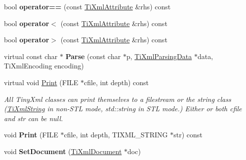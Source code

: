 \begin{DoxyCompactItemize}
\item 
bool {\bfseries operator==} (const \hyperlink{class_ti_xml_attribute}{Ti\+Xml\+Attribute} \&rhs) const \hypertarget{class_ti_xml_attribute_ae48c2a65b520d453914ce4e845d607cf}{}\label{class_ti_xml_attribute_ae48c2a65b520d453914ce4e845d607cf}

\item 
bool {\bfseries operator$<$} (const \hyperlink{class_ti_xml_attribute}{Ti\+Xml\+Attribute} \&rhs) const \hypertarget{class_ti_xml_attribute_adb8b6f2cad5948e73e383182e7ce10de}{}\label{class_ti_xml_attribute_adb8b6f2cad5948e73e383182e7ce10de}

\item 
bool {\bfseries operator$>$} (const \hyperlink{class_ti_xml_attribute}{Ti\+Xml\+Attribute} \&rhs) const \hypertarget{class_ti_xml_attribute_a867562769ef9778c1690cd373246b05b}{}\label{class_ti_xml_attribute_a867562769ef9778c1690cd373246b05b}

\item 
virtual const char $\ast$ {\bfseries Parse} (const char $\ast$p, \hyperlink{class_ti_xml_parsing_data}{Ti\+Xml\+Parsing\+Data} $\ast$data, Ti\+Xml\+Encoding encoding)\hypertarget{class_ti_xml_attribute_ad62774421b814894b995af3b5d231dda}{}\label{class_ti_xml_attribute_ad62774421b814894b995af3b5d231dda}

\item 
virtual void \hyperlink{class_ti_xml_attribute_acc04956c1d5c4c31fe74f7a7528d109a}{Print} (F\+I\+LE $\ast$cfile, int depth) const 
\begin{DoxyCompactList}\small\item\em All Tiny\+Xml classes can print themselves to a filestream or the string class (\hyperlink{class_ti_xml_string}{Ti\+Xml\+String} in non-\/\+S\+TL mode, std\+::string in S\+TL mode.) Either or both cfile and str can be null. \end{DoxyCompactList}\item 
void {\bfseries Print} (F\+I\+LE $\ast$cfile, int depth, T\+I\+X\+M\+L\+\_\+\+S\+T\+R\+I\+NG $\ast$str) const \hypertarget{class_ti_xml_attribute_a19e6b6862a80b188571c47947e88d030}{}\label{class_ti_xml_attribute_a19e6b6862a80b188571c47947e88d030}

\item 
void {\bfseries Set\+Document} (\hyperlink{class_ti_xml_document}{Ti\+Xml\+Document} $\ast$doc)\hypertarget{class_ti_xml_attribute_ac12a94d4548302afb12f488ba101f7d1}{}\label{class_ti_xml_attribute_ac12a94d4548302afb12f488ba101f7d1}

\end{DoxyCompactItemize}
